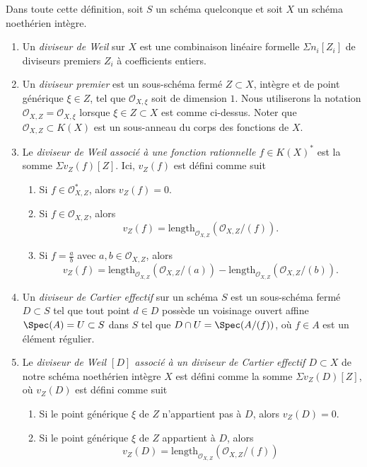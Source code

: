 \begin{definition}
\label{definition-divisor}
Dans toute cette définition, soit $S$ un schéma quelconque et soit
$X$ un schéma noethérien intègre.
\begin{enumerate}
\item Un {\it diviseur de Weil} sur $X$ est une combinaison linéaire formelle
$\Sigma n_i[Z_i]$ de diviseurs premiers $Z_i$ à coefficients entiers.
\item Un {\it diviseur premier} est un sous-schéma fermé $Z \subset X$,
intègre et de point générique $\xi \in Z$, tel que
${\mathcal O}_{X, \xi}$ soit de dimension $1$. Nous utiliserons la notation
${\mathcal O}_{X, Z} = {\mathcal O}_{X, \xi}$
lorsque $\xi \in Z \subset X$ est comme ci-dessus. Noter que ${\mathcal O}_{X, Z} \subset
K(X)$ est un sous-anneau du corps des fonctions de $X$.
\item Le {\it diviseur de Weil associé à une fonction rationnelle
$f \in K(X)^\ast$} est la somme $\Sigma v_Z(f)[Z]$. Ici, $v_Z(f)$ est
défini comme suit
\begin{enumerate}
\item Si $f \in {\mathcal O}_{X, Z}^\ast$, alors $v_Z(f) = 0$.
\item Si $f \in {\mathcal O}_{X, Z}$, alors
$$
v_Z(f) = \text{length}_{{\mathcal O}_{X, Z}}({\mathcal O}_{X, Z}/(f)).
$$
\item Si $f = \frac{a}{b}$ avec $a, b \in {\mathcal O}_{X, Z}$,
alors
$$
v_Z(f) = \text{length}_{{\mathcal O}_{X, Z}}({\mathcal O}_{X, Z}/(a)) -
\text{length}_{{\mathcal O}_{X, Z}}({\mathcal O}_{X, Z}/(b)).
$$
\end{enumerate}
\item Un {\it diviseur de Cartier effectif} sur un schéma $S$
est un sous-schéma fermé $D \subset S$ tel que tout point $d\in D$
possède un voisinage ouvert affine $\Spec(A) = U \subset S$ dans $S$
tel que $D \cap U = \Spec(A/(f))$, où $f \in A$ est un élément régulier.
\item Le {\it diviseur de Weil $[D]$ associé à un diviseur
de Cartier effectif $D \subset X$} de notre schéma noethérien intègre
$X$ est défini comme la somme $\Sigma v_Z(D)[Z]$, où
$v_Z(D)$ est défini comme suit
\begin{enumerate}
\item Si le point générique $\xi$ de $Z$ n'appartient pas à $D$,
alors $v_Z(D) = 0$.
\item Si le point générique $\xi$ de $Z$ appartient à $D$,
alors
$$
v_Z(D) = \text{length}_{{\mathcal O}_{X, Z}}({\mathcal O}_{X, Z}/(f))
$$
\end{enumerate}
\end{enumerate}
\end{definition}
